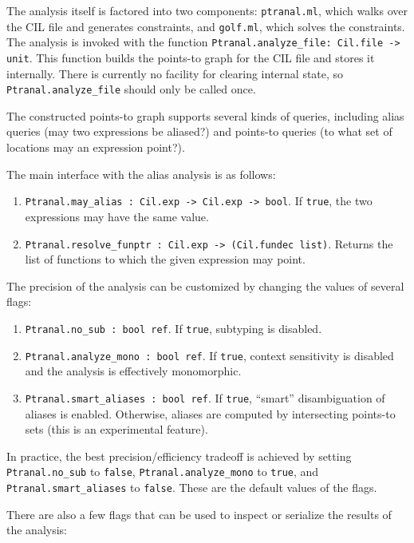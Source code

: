 \documentclass{article}
\def\t#1{{\tt #1}}
\begin{document}
The analysis itself is factored into two components: \t{ptranal.ml},
which walks over the CIL file and generates constraints, and
\t{golf.ml}, which solves the constraints. The analysis is invoked
with the function \t{Ptranal.analyze\_file: Cil.file -> unit}. This
function builds the points-to graph for the CIL file and stores it
internally. There is currently no facility for clearing internal
state, so \t{Ptranal.analyze\_file} should only be called once.

The constructed points-to graph supports several kinds of queries,
including alias queries (may two expressions be aliased?) and
points-to queries (to what set of locations may an expression point?).

The main interface with the alias analysis is as follows:
\begin{enumerate}
\item \t{Ptranal.may\_alias : Cil.exp -> Cil.exp -> bool}. If \t{true}, the
two expressions may have the same value. 
\item \t{Ptranal.resolve\_funptr : Cil.exp -> (Cil.fundec list)}. Returns
the list of functions to which the given expression may point. 
\end{enumerate} 

The precision of the analysis can be customized by changing the values
of several flags:

\begin{enumerate}
\item \t{Ptranal.no\_sub : bool ref}. If \t{true}, subtyping is
disabled.
\item \t{Ptranal.analyze\_mono : bool ref}. If \t{true}, context
sensitivity is disabled and the analysis is effectively monomorphic.
\item \t{Ptranal.smart\_aliases : bool ref}. If \t{true}, ``smart''
disambiguation of aliases is enabled. Otherwise, aliases are computed
by intersecting points-to sets (this is an experimental feature).
\end{enumerate}

In practice, the best precision/efficiency tradeoff is achieved by
setting \t{Ptranal.no\_sub} to \t{false}, \t{Ptranal.analyze\_mono} to
\t{true}, and \t{Ptranal.smart\_aliases} to \t{false}. These are the
default values of the flags.

There are also a few flags that can be used to inspect or serialize
the results of the analysis:
\end{document}
